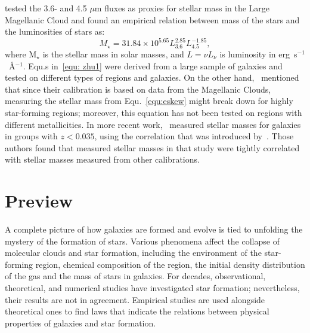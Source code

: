 \cite{Eskew12} tested the 3.6- and 4.5 $\mu$m fluxes as proxies for stellar mass in the Large Magellanic Cloud and found an empirical relation between mass of the stars and the luminosities of stars as:
\begin{equation}
\label{equ:eskew}
  M_{\star} = 31.84 \times 10^{5.65} L_{3.6}^{2.85} L_{4.5}^{-1.85},
\end{equation}
where M$_{\star}$ is the stellar mass in solar masses, and $L = \nu L_{\nu}$ is luminosity in erg~s$^{-1}$~\AA$^{-1}$.
Equ.s in~\ref{equ: zhu1} were derived from a large sample of galaxies and tested on different types of regions and galaxies.
On the other hand,~\cite{Eskew12} mentioned that since their calibration is based on data from the Magellanic Clouds,
measuring the stellar mass from Equ.~\ref{equ:eskew} might break down for highly star-forming regions; moreover, this equation has not been tested on regions with different metallicities. 
In more recent work,~\cite{Laura16} measured stellar masses for galaxies in groups with $z < 0.035$, using the correlation that was introduced by~\cite{Eskew12}. 
Those authors found that measured stellar masses in that study were tightly correlated with stellar masses measured from other calibrations.

\section{Preview}
\label{sec: pre_intro}

A complete picture of how galaxies are formed and evolve is tied to unfolding the mystery of the formation of stars.
Various phenomena affect the collapse of molecular clouds and star formation, including the environment of the star-forming region, chemical composition of the region, the initial density distribution of the gas and the mass of stars in galaxies.
For decades, observational, theoretical, and numerical studies have investigated star formation; nevertheless, their results are not in agreement.
Empirical studies are used alongside theoretical ones to find laws that indicate the relations between physical properties of galaxies and star formation.

